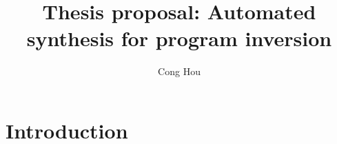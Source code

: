 \documentclass[12pt]{gatech-thesis}
\title{Thesis proposal: Automated synthesis for program inversion} %
\author{Cong Hou}
\begin{document}


\begin{preliminary}



\contents
\end{preliminary}
\chapter{Introduction}


\newcommand{\naive}{na\"ive\xspace}
\newcommand{\Program}{\ensuremath{P}\xspace}
\newcommand{\Forward}{\ensuremath{\Program^{+}}\xspace}
\newcommand{\Inverse}{\ensuremath{\Program^{-}}\xspace}
\newcommand{\Input}{\ensuremath{I}\xspace}
\newcommand{\Output}{\ensuremath{O}\xspace}
\newcommand{\ExtraOuts}{\ensuremath{S}\xspace}
\newcommand{\OutsS}{\ensuremath{\Outs+\ExtraOuts}\xspace}
\newcommand{\Var}{\ensuremath{v}\xspace}
\newcommand{\Vars}{\ensuremath{V}\xspace}
\newcommand{\Exec}[4]{\ensuremath{{#1}\{{#2}={#3}\} \rightarrow \{{#2}={#4}\}}\xspace}


\newcommand{\varmbox}[2]{\ensuremath{{#1}_{\tiny\mbox{#2}}}}
\newcommand{\vmu}{\ensuremath{\varmbox{v}{in}^I}\xspace}
\newcommand{\vinit}{\ensuremath{\varmbox{v}{in}}\xspace}
\newcommand{\veta}{\ensuremath{\varmbox{v}{\eta}}\xspace}
\newcommand{\vfinal}{\ensuremath{\varmbox{v}{out}}\xspace}
\newcommand{\vmup}{\ensuremath{\varmbox{v}{\mu}'}\xspace}
\newcommand{\viter}{\ensuremath{\varmbox{v}{out}^I}\xspace}
\newcommand{\viterp}{\ensuremath{\varmbox{v}{iter}'}\xspace}
\newcommand{\mufunc}{\ensuremath{\varmbox{v}{in}^I=\mu(v_{in},v_{out}^I)}\xspace}
\newcommand{\etafunc}{\ensuremath{\varmbox{v}{out}=\eta(v_{in}^I)}\xspace}
\newcommand{\Loop}{\ensuremath{L}\xspace}
\end{document}
